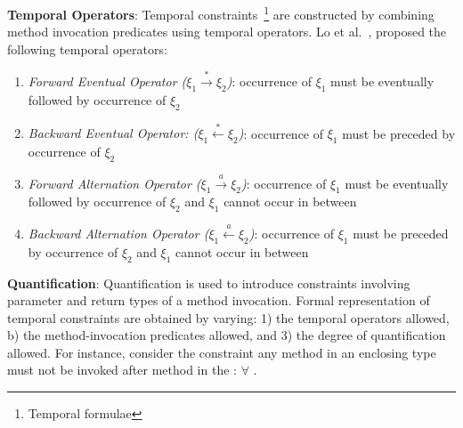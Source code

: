 \textbf{Temporal Operators}: Temporal constraints~\footnote{Temporal formulae} are constructed by combining method invocation predicates using temporal operators. Lo et al.~\cite{lo2009mining}, proposed the following temporal operators:   

\begin{enumerate}

\item \textit{Forward Eventual Operator ($\xi_1 \xrightarrow{*} \xi_2$)}:
occurrence of $\xi_1$ must be eventually followed by occurrence of $\xi_2$

\item \textit{Backward Eventual Operator: ($\xi_1 \xleftarrow{*} \xi_2$)}:
occurrence of $\xi_1$ must be preceded by occurrence of $\xi_2$

\item \textit{Forward Alternation Operator ($\xi_1 \xrightarrow{a} \xi_2$)}:
occurrence of $\xi_1$ must be eventually followed by occurrence of $\xi_2$ and $\xi_1$ cannot occur in between

\item \textit{Backward Alternation Operator ($\xi_1 \xleftarrow{a} \xi_2$)}:
occurrence of $\xi_1$ must be preceded by occurrence of $\xi_2$ and $\xi_1$ cannot occur in between
\end{enumerate}

\textbf{Quantification}: Quantification is used to introduce constraints involving parameter and return types of a method invocation. Formal representation of temporal constraints are obtained by varying: 1) the temporal operators allowed, b) the method-invocation predicates allowed, and 3) the degree of quantification allowed. For instance, consider the constraint any method in an enclosing type  must not be invoked after method  in the : $\forall$ .
